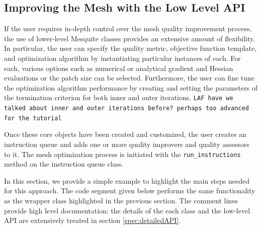 \subsection{Improving the Mesh with the Low Level API}
\label{sec:tutDetailedAPI}
If the user requires in-depth control over the mesh quality improvement
process, the use of lower-level Mesquite classes provides an extensive
amount of flexibility.   In particular, the user can specify the quality
metric, objective function template, and optimization algorithm by
instantiating particular instances of each.  For each, various options
such as numerical or analytical gradient and Hessian evaluations or
the patch size can be selected.  Furthermore, the user can fine tune
the optimization algorithm performance by creating and setting the parameters 
of the termination criterion for both inner and outer iterations.
{\tt LAF have we talked about inner and outer iterations before? perhaps
too advanced for the tutorial}

Once these core objects have been created and customized, the user
creates an instruction queue and adds one or more quality improvers
and quality assessors to it.  The mesh optimization process is initiated
with the {\tt run\_instructions} method on the instruction queue
class.

In this section, we provide a simple example to highlight the main
steps needed for this approach.  The code segment given below performs
the same functionality as the wrapper class highlighted in the
previous section.  The comment lines provide high level documentation;
the details of the each class and the low-level API are extensively
treated in section
\ref{spec:detailedAPI}.

